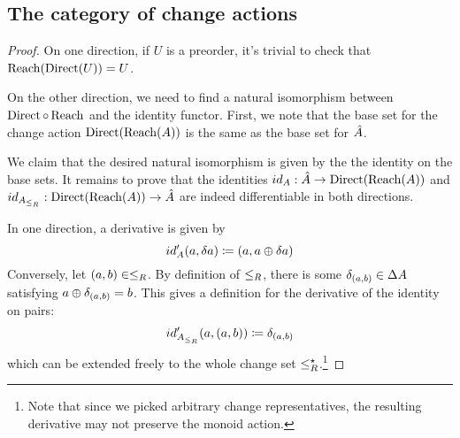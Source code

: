 \subsection{The category of change actions}

\preordEquivalence*
\begin{proof}
  \label{prf:preordEquivalence}
  On one direction, if $U$ is a preorder, it's trivial to check that $\operatorname{Reach} (\operatorname{Direct} (U)) = U$.

  On the other direction, we need to find a natural isomorphism between $\operatorname{Direct} \circ \operatorname{Reach}$
  and the identity functor. First, we note that the base set for the change action
  $\operatorname{Direct}(\operatorname{Reach}(A))$ is the same as the base set for $\hat{A}$.

  We claim that the desired natural isomorphism is given by the
  the identity on the base sets. It remains to prove that the identities
  $id_A : \hat{A} \rightarrow \operatorname{Direct}(\operatorname{Reach}(A))$ and
  $id_{A_{\leq_R}} : \operatorname{Direct}(\operatorname{Reach}(A)) \rightarrow \hat{A}$
  are indeed differentiable in both directions.

  In one direction, a derivative is given by
  \begin{displaymath}
    id'_A(a, \delta a) \coloneqq (a, a \oplus \delta a)
  \end{displaymath}
  Conversely, let $(a, b) \in \leq_R$. By definition of $\leq_R$, there is some
  $\delta_{(a, b)} \in \Delta A$ satisfying $a \oplus \delta_{(a,b)} = b$.
  This gives a definition for the derivative of the identity on pairs:
  \begin{displaymath}
    id'_{A_{\leq_R}}(a, (a, b)) \coloneqq \delta_{(a, b)}
  \end{displaymath}
  which can be extended freely to the whole change set
  $\leq_R^\star$.\footnote{Note that since we picked arbitrary change
    representatives, the resulting derivative may not preserve the monoid action.}
\end{proof}

